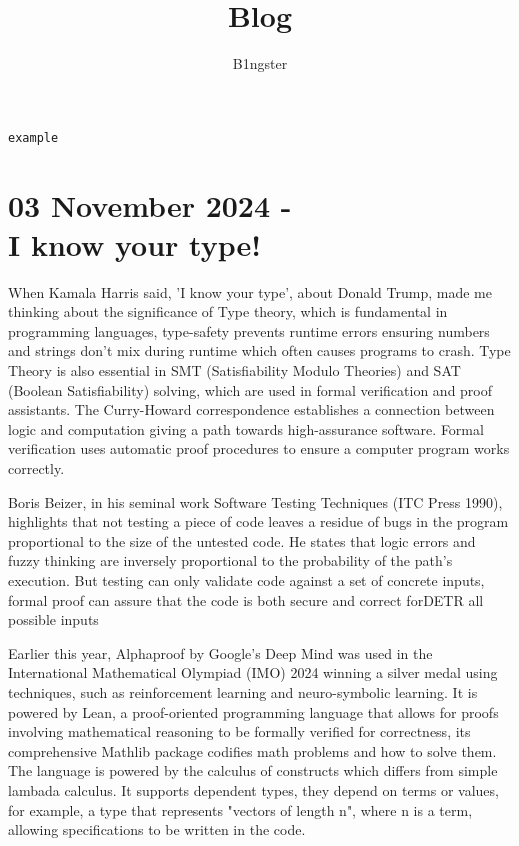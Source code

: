 \documentclass{article}
\title{Blog}
\author{B1ngster}
\date{}
\newcommand{\cmdname}[1]{\texttt{#1}}
\begin{document}
\maketitle
\newpage


\tableofcontents
\newpage\cmdname{example}



\newpage
 
\section*{03 November 2024 - \\ I know your type! }

When Kamala Harris said, 'I know your type', about Donald Trump, made me thinking about the significance of Type theory, which is fundamental in programming languages, type-safety prevents runtime errors ensuring numbers and strings don't mix during runtime which often causes programs to crash. Type Theory is also essential in SMT (Satisfiability Modulo Theories) and SAT (Boolean Satisfiability) solving, which are used in formal verification and proof assistants.  The Curry-Howard correspondence establishes a connection between logic and computation giving a path towards high-assurance software. Formal verification uses automatic proof procedures to ensure a computer program works correctly. 

Boris Beizer, in his seminal work Software Testing Techniques (ITC Press 1990), highlights that not testing a piece of code leaves a residue of bugs in the program proportional to the size of the untested code. He states that logic errors and fuzzy thinking are inversely proportional to the probability of the path’s execution. But testing can only validate code against a set of concrete inputs, formal proof can assure that the code is both secure and correct forDETR all possible inputs

Earlier this year, Alphaproof by Google's Deep Mind was used in the International Mathematical Olympiad (IMO) 2024 winning a silver medal using techniques, such as reinforcement learning and neuro-symbolic learning.  It is powered by Lean, a proof-oriented programming language that allows for proofs involving mathematical reasoning to be formally verified for correctness, its comprehensive Mathlib package codifies math problems and how to solve them. The language is powered by the calculus of constructs which differs from simple lambada calculus. It supports dependent types, they depend on terms or values, for example, a type that represents "vectors of length n", where n is a term, allowing specifications to be written in the code. 
\end{document}

